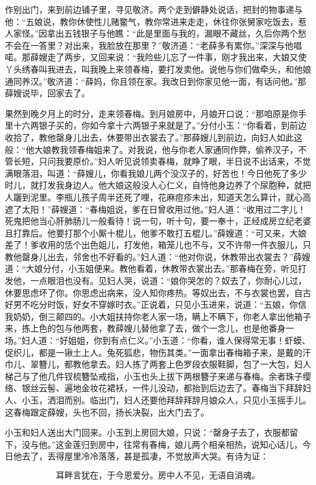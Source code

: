 作别出门，来到前边铺子里，寻见敬济。两个走到僻静处说话，把封的物事递与他：“五娘说，教你休使性儿赌鳖气，教你常进来走走，休往你张舅家吃饭去，惹人家怪。”因拿出五钱银子与他瞧：“此是里面与我的，漏眼不藏丝，久后你两个愁不会在一答里？对出来，我脸放在那里？”敬济道：“老薛多有累你。”深深与他唱喏。那薛嫂走了两步，又回来说：“我险些儿忘了一件事，刚才我出来，大娘又使丫头绣春叫我进去，叫我晚上来领春梅，要打发卖他。说他与你们做牵头，和他娘通同养汉。”敬济道：“薛妈，你且领在家。我改日到你家见他一面，有话问他。”那薛嫂说毕，回家去了。

果然到晚夕月上的时分，走来领春梅。到月娘房中，月娘开口说：“那咱原是你手里十六两银子买的，你如今拿十六两银子来就是了。”分付小玉：“你看着，到前边收拾了，教他罄身儿出去，休要带出衣裳去了。”那薛嫂儿到前边，向妇人如此这般：“他大娘教我领春梅姐来了。对我说，他与你老人家通同作弊，偷养汉子，不管长短，只问我要原价。”妇人听见说领卖春梅，就睁了眼，半日说不出话来，不觉满眼落泪，叫道：“薛嫂儿，你看我娘儿两个没汉子的，好苦也！今日他死了多少时儿，就打发我身边人。他大娘这般没人心仁义，自恃他身边养了个尿胞种，就把人躧到泥里。李瓶儿孩子周半还死了哩，花麻痘疹未出，知道天怎么算计，就心高遮了太阳！”薛嫂道：“春梅姐说，爹在日曾收用过他。”妇人道：“收用过二字儿！死鬼把他当心肝肺肠儿一般看待！说一句，听十句，要一奉十，正经成房立纪老婆且打靠后。他要打那个小厮十棍儿，他爹不敢打五棍儿。”薛嫂道：“可又来，大娘差了！爹收用的恁个出色姐儿，打发他，箱笼儿也不与，又不许带一件衣服儿，只教他罄身儿出去，邻舍也不好看的。”妇人道：“他对你说，休教带出衣裳去？”薛嫂道：“大娘分付，小玉姐便来。教他看着，休教带衣裳出去。”那春梅在旁，听见打发他，一点眼泪也没有。见妇人哭，说道：“娘你哭怎的？奴去了，你耐心儿过，休要思虑坏了你。你思虑出病来，没人知你疼热。等奴出去，不与衣裳也罢，自古好男不吃分时饭，好女不穿嫁时衣。”正说着，只见小玉进来，说道：“五娘，你信我奶奶，倒三颠四的。小大姐扶持你老人家一场，瞒上不瞒下，你老人拿出他箱子来，拣上色的包与他两套，教薛嫂儿替他拿了去，做个一念儿，也是他番身一场。”妇人道：“好姐姐，你到有点仁义。”小玉道：“你看，谁人保得常无事！虾蟆、促织儿，都是一锹土上人。兔死狐悲，物伤其类。”一面拿出春梅箱子来，是戴的汗巾儿、翠簪儿，都教他拿去。妇人拣了两套上色罗段衣服鞋脚，包了一大包，妇人梯己与了他几件钗梳簪坠戒指，小玉也头上拔下两根簪子来递与春梅。余者珠子缨络、银丝云髻、遍地金妆花裙袄，一件儿没动，都抬到后边去了。春梅当下拜辞妇人、小玉，洒泪而别。临出门，妇人还要他拜辞拜辞月娘众人，只见小玉摇手儿。这春梅跟定薛嫂，头也不回，扬长决裂，出大门去了。

小玉和妇人送出大门回来。小玉到上房回大娘，只说：“罄身子去了，衣服都留下，没与他。”这金莲归到房中，往常有春梅，娘儿两个相亲相热，说知心话儿，今日他去了，丢得屋里冷冷落落，甚是孤凄，不觉放声大哭。有诗为证：

\[
耳畔言犹在，于今恩爱分。
房中人不见，无语自消魂。
\]
